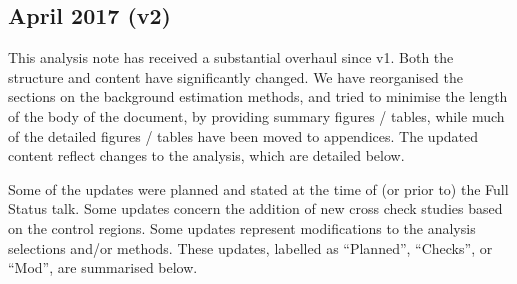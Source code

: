 \subsection{April 2017 (v2)}

This analysis note has received a substantial overhaul since v1. Both
the structure and content have significantly changed.  We have
reorganised the sections on the background estimation methods, and
tried to minimise the length of the body of the document, by providing
summary figures / tables, while much of the detailed figures / tables
have been moved to appendices. The updated content reflect changes to
the analysis, which are detailed below.

Some of the updates were planned and stated at the time of (or prior
to) the Full Status talk. Some updates concern the addition of new
cross check studies based on the control regions. Some updates
represent modifications to the analysis selections and/or
methods. These updates, labelled as ``Planned'', ``Checks'', or
``Mod'', are summarised below.
  
